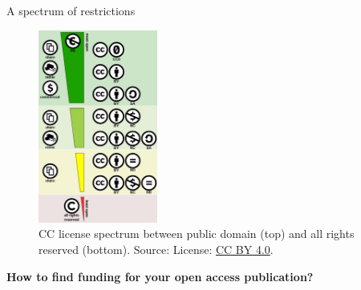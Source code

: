 \documentclass{beamer}
\begin{document}
\begin{frame}{A spectrum of restrictions}
	\begin{figure}
		\includegraphics[width=0.35\textwidth]{cc_spectrum.png}
		\caption{CC license spectrum between public domain (top) and all rights reserved (bottom). Source: \citet{shaddim_file:creative_2016}  License: \href{https://creativecommons.org/licenses/by/4.0/}{CC BY 4.0}.}
	\end{figure}
\end{frame}


\begin{frame}{}
\begin{center}
	\textbf{\large How to find funding for your open access publication?}
\end{center}
\end{frame}


\end{document}
